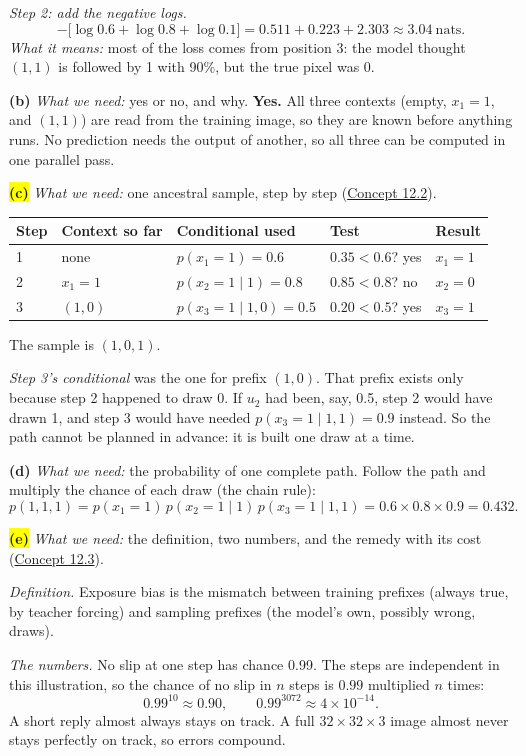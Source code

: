 \documentclass[12pt,a4paper]{article}
\begin{document}
\emph{Step 2: add the negative logs.}
\[
-\big[\log0.6+\log0.8+\log0.1\big]=0.511+0.223+2.303\approx3.04\ \text{nats}.
\]
\emph{What it means:} most of the loss comes from position 3: the model thought $(1,1)$ is followed by 1 with 90\%, but the true pixel was 0.

\textbf{(b)} \emph{What we need:} yes or no, and why. \textbf{Yes.} All three contexts (empty, $x_1=1$, and $(1,1)$) are read from the training image, so they are known before anything runs. No prediction needs the output of another, so all three can be computed in one parallel pass.

\colorbox{yellow}{\textbf{(c)}} \emph{What we need:} one ancestral sample, step by step (\hyperref[c12-2]{Concept 12.2}).
\begin{center}
\begin{tabular}{@{}lllll@{}}
\toprule
Step & Context so far & Conditional used & Test & Result \\
\midrule
1 & none & $p(x_1=1)=0.6$ & $0.35<0.6$? yes & $x_1=1$ \\
2 & $x_1=1$ & $p(x_2=1\mid1)=0.8$ & $0.85<0.8$? no & $x_2=0$ \\
3 & $(1,0)$ & $p(x_3=1\mid1,0)=0.5$ & $0.20<0.5$? yes & $x_3=1$ \\
\bottomrule
\end{tabular}
\end{center}
The sample is $(1,0,1)$.

\emph{Step 3's conditional} was the one for prefix $(1,0)$. That prefix exists only because step 2 happened to draw 0. If $u_2$ had been, say, 0.5, step 2 would have drawn 1, and step 3 would have needed $p(x_3=1\mid1,1)=0.9$ instead. So the path cannot be planned in advance: it is built one draw at a time.

\textbf{(d)} \emph{What we need:} the probability of one complete path. Follow the path and multiply the chance of each draw (the chain rule):
\[
p(1,1,1)=p(x_1=1)\,p(x_2=1\mid1)\,p(x_3=1\mid1,1)=0.6\times0.8\times0.9=0.432 .
\]

\colorbox{yellow}{\textbf{(e)}} \emph{What we need:} the definition, two numbers, and the remedy with its cost (\hyperref[c12-3]{Concept 12.3}).

\emph{Definition.} Exposure bias is the mismatch between training prefixes (always true, by teacher forcing) and sampling prefixes (the model's own, possibly wrong, draws).

\emph{The numbers.} No slip at one step has chance 0.99. The steps are independent in this illustration, so the chance of no slip in $n$ steps is $0.99$ multiplied $n$ times:
\[
0.99^{10}\approx0.90,\qquad 0.99^{3072}\approx4\times10^{-14}.
\]
A short reply almost always stays on track. A full $32\times32\times3$ image almost never stays perfectly on track, so errors compound.
\end{document}
